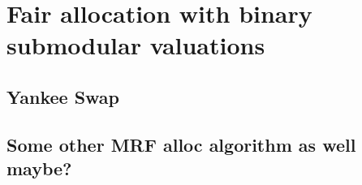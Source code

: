 \chapter{Fair allocation with binary submodular valuations}
\skelpars[2]

\section{Yankee Swap}
\skelpars[12]

\section{Some other MRF alloc algorithm as well maybe?}
\skelpars[9]